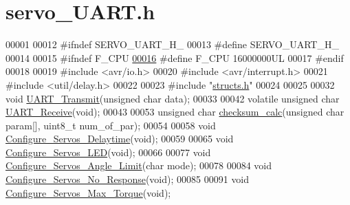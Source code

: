 \hypertarget{servo___u_a_r_t_8h_source}{}\section{servo\+\_\+\+U\+A\+R\+T.\+h}
\label{servo___u_a_r_t_8h_source}

\begin{DoxyCode}
00001 
00012 \textcolor{preprocessor}{#ifndef SERVO\_UART\_H\_}
00013 \textcolor{preprocessor}{#define SERVO\_UART\_H\_}
00014 
00015 \textcolor{preprocessor}{#ifndef F\_CPU}
\hypertarget{servo___u_a_r_t_8h_source.tex_l00016}{}\hyperlink{servo___u_a_r_t_8h_a43bafb28b29491ec7f871319b5a3b2f8}{00016} \textcolor{preprocessor}{#define F\_CPU 16000000UL    }
00017 \textcolor{preprocessor}{#endif}
00018 
00019 \textcolor{preprocessor}{#include <avr/io.h>}
00020 \textcolor{preprocessor}{#include <avr/interrupt.h>}
00021 \textcolor{preprocessor}{#include <util/delay.h>}
00022 
00023 \textcolor{preprocessor}{#include "\hyperlink{structs_8h}{structs.h}"}
00024 
00025 
00032 \textcolor{keywordtype}{void} \hyperlink{servo___u_a_r_t_8h_af34dbb08e8f6cfc1a58d9b7f2b81f455}{UART\_Transmit}(\textcolor{keywordtype}{unsigned} \textcolor{keywordtype}{char} data);
00033 
00042 \textcolor{keyword}{volatile} \textcolor{keywordtype}{unsigned} \textcolor{keywordtype}{char} \hyperlink{servo___u_a_r_t_8h_ae61a7bb5a727a8605e5865fc36e4e26b}{UART\_Receive}(\textcolor{keywordtype}{void});
00043 
00053 \textcolor{keywordtype}{unsigned} \textcolor{keywordtype}{char} \hyperlink{servo___u_a_r_t_8h_a45e02356d032e2069888899bf1a987bf}{checksum\_calc}(\textcolor{keywordtype}{unsigned} \textcolor{keywordtype}{char} param[], uint8\_t num\_of\_par);
00054 
00058 \textcolor{keywordtype}{void} \hyperlink{servo___u_a_r_t_8h_a7522eb3c86cfa713aade9cbe082bcbba}{Configure\_Servos\_Delaytime}(\textcolor{keywordtype}{void});
00059 
00065 \textcolor{keywordtype}{void} \hyperlink{servo___u_a_r_t_8h_ae7bfd5ff29686df194ec9f4e310cf2e4}{Configure\_Servos\_LED}(\textcolor{keywordtype}{void});
00066 
00077 \textcolor{keywordtype}{void} \hyperlink{servo___u_a_r_t_8h_ac61953255036321acac8c2e20b76d692}{Configure\_Servos\_Angle\_Limit}(\textcolor{keywordtype}{char} mode);
00078 
00084 \textcolor{keywordtype}{void} \hyperlink{servo___u_a_r_t_8h_a17e89f3d8b4abe3abe352ffba8b684f1}{Configure\_Servos\_No\_Response}(\textcolor{keywordtype}{void});
00085 
00091 \textcolor{keywordtype}{void} \hyperlink{servo___u_a_r_t_8h_a2f788735cafd686c547c9340d905c3ad}{Configure\_Servos\_Max\_Torque}(\textcolor{keywordtype}{void});

\end{DoxyCode}
